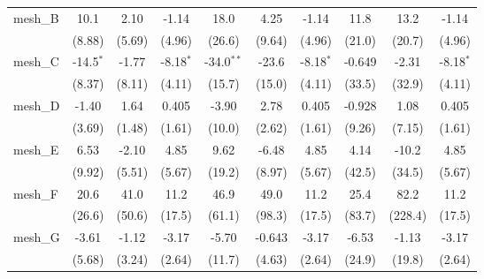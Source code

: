\begin{tabular}{lccccccccc}
   mesh\_B                                                     & 10.1          & 2.10          & -1.14         & 18.0           & 4.25          & -1.14         & 11.8    & 13.2      & -1.14\\   
                                                               & (8.88)        & (5.69)        & (4.96)        & (26.6)         & (9.64)        & (4.96)        & (21.0)  & (20.7)    & (4.96)\\   
   mesh\_C                                                     & -14.5$^{*}$   & -1.77         & -8.18$^{*}$   & -34.0$^{**}$   & -23.6         & -8.18$^{*}$   & -0.649  & -2.31     & -8.18$^{*}$\\   
                                                               & (8.37)        & (8.11)        & (4.11)        & (15.7)         & (15.0)        & (4.11)        & (33.5)  & (32.9)    & (4.11)\\   
   mesh\_D                                                     & -1.40         & 1.64          & 0.405         & -3.90          & 2.78          & 0.405         & -0.928  & 1.08      & 0.405\\   
                                                               & (3.69)        & (1.48)        & (1.61)        & (10.0)         & (2.62)        & (1.61)        & (9.26)  & (7.15)    & (1.61)\\   
   mesh\_E                                                     & 6.53          & -2.10         & 4.85          & 9.62           & -6.48         & 4.85          & 4.14    & -10.2     & 4.85\\   
                                                               & (9.92)        & (5.51)        & (5.67)        & (19.2)         & (8.97)        & (5.67)        & (42.5)  & (34.5)    & (5.67)\\   
   mesh\_F                                                     & 20.6          & 41.0          & 11.2          & 46.9           & 49.0          & 11.2          & 25.4    & 82.2      & 11.2\\   
                                                               & (26.6)        & (50.6)        & (17.5)        & (61.1)         & (98.3)        & (17.5)        & (83.7)  & (228.4)   & (17.5)\\   
   mesh\_G                                                     & -3.61         & -1.12         & -3.17         & -5.70          & -0.643        & -3.17         & -6.53   & -1.13     & -3.17\\   
                                                               & (5.68)        & (3.24)        & (2.64)        & (11.7)         & (4.63)        & (2.64)        & (24.9)  & (19.8)    & (2.64)\\   

\end{tabular}
